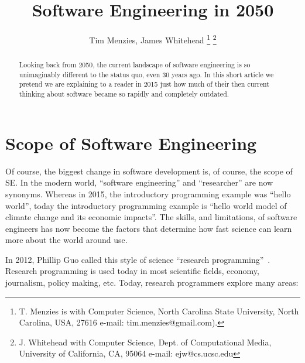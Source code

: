 \documentclass[journal]{IEEEtran}
\begin{document}
 
\title{Software Engineering in 2050}%
\author{Tim Menzies, James Whitehead%
\thanks{T. Menzies is with Computer Science,
North Carolina State University, North Carolina, USA, 27616 e-mail: tim.menzies@gmail.com).}%
\thanks{J. Whitehead with Computer Science, Dept. of Computational Media,
University of California, CA, 95064 e-mail: ejw@cs.ucsc.edu}}%
 
\maketitle

\begin{abstract}
  Looking back from 2050, the current landscape of
software engineering is so unimaginably different to
the status quo, even 30 years ago.  In this short article we pretend we are
explaining to a reader in 2015 just how much of
their then current thinking about software 
became so rapidly and completely outdated.
\end{abstract}


\section{Scope of Software Engineering}


Of course, the biggest change in software development is, of
course, the scope of SE.
In the modern world,
``software engineering'' and ``researcher'' are now synonyms. Whereas in
2015, the introductory programming example was ``hello world'', today
the introductory programming example is ``hello world model of climate
change and its economic impacts''.
The skills, and limitations, of software engineers has now become
the factors that determine how fast science can learn more about
the world around use.


In 2012,
Phillip Guo called this style of science ``research programming''~\cite{guo12}. Research programming is used today in most scientific fields, economy, journalism, policy making, etc.  Today, research programmers explore many areas:
\end{document}

